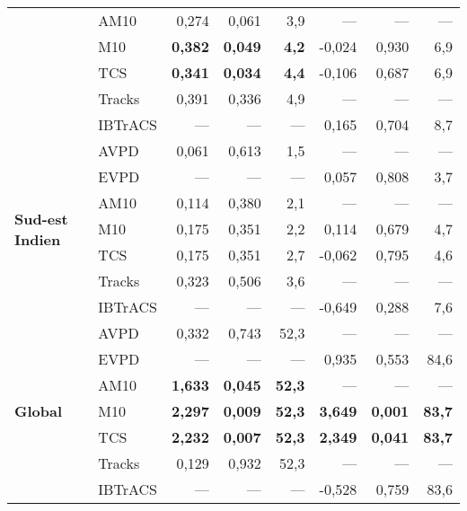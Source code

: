 \documentclass[../main.tex]{subfiles}
\begin{document}
\begin{table}[htpb]
\begin{adjustbox}{height=0.45\textheight}
\begin{tabular}{llrrr|rrr}
         & AM10 & 0,274 & 0,061 & 3,9 & --- & --- & --- \\
         & M10 & \textbf{0,382} & \textbf{0,049} & \textbf{4,2} & -0,024 & 0,930 & 6,9 \\
         & TCS & \textbf{0,341} & \textbf{0,034} & \textbf{4,4} & -0,106 & 0,687 & 6,9 \\
         & Tracks & 0,391 & 0,336 & 4,9 & --- & --- & --- \\
         & IBTrACS & --- & --- & --- & 0,165 & 0,704 & 8,7 \\
        \cline{1-8}
        \multirow[t]{7}{*}{\textbf{Sud-est Indien}} & AVPD & 0,061 & 0,613 & 1,5 & --- & --- & --- \\
         & EVPD & --- & --- & --- & 0,057 & 0,808 & 3,7 \\
         & AM10 & 0,114 & 0,380 & 2,1 & --- & --- & --- \\
         & M10 & 0,175 & 0,351 & 2,2 & 0,114 & 0,679 & 4,7 \\
         & TCS & 0,175 & 0,351 & 2,7 & -0,062 & 0,795 & 4,6 \\
         & Tracks & 0,323 & 0,506 & 3,6 & --- & --- & --- \\
         & IBTrACS & --- & --- & --- & -0,649 & 0,288 & 7,6 \\
        \cline{1-8}
        \multirow[t]{7}{*}{\textbf{Global}} & AVPD & 0,332 & 0,743 & 52,3 & --- & --- & --- \\
         & EVPD & --- & --- & --- & 0,935 & 0,553 & 84,6 \\
         & AM10 & \textbf{1,633} & \textbf{0,045} & \textbf{52,3} & --- & --- & --- \\
         & M10 & \textbf{2,297} & \textbf{0,009} & \textbf{52,3} & \textbf{3,649} & \textbf{0,001} & \textbf{83,7} \\
         & TCS & \textbf{2,232} & \textbf{0,007} & \textbf{52,3} & \textbf{2,349} & \textbf{0,041} & \textbf{83,7} \\
         & Tracks & 0,129 & 0,932 & 52,3 & --- & --- & --- \\
         & IBTrACS & --- & --- & --- & -0,528 & 0,759 & 83,6 \\
        \bottomrule
        \end{tabular}
\end{adjustbox}
\end{table}
\end{document}
